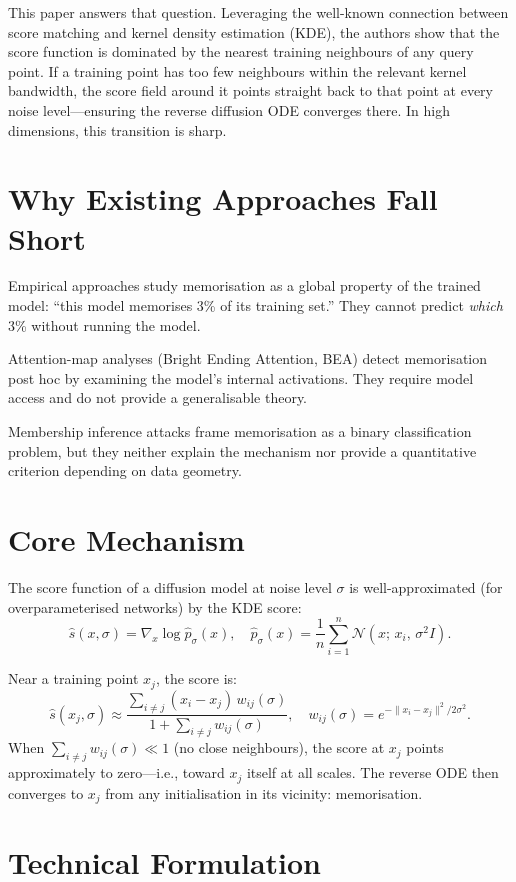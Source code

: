 \documentclass[10pt,twocolumn]{article}
\begin{document}
This paper answers that question. Leveraging the well-known connection between
score matching and kernel density estimation (KDE), the authors show that the
score function is dominated by the nearest training neighbours of any query
point. If a training point has too few neighbours within the relevant kernel
bandwidth, the score field around it points straight back to that point at
every noise level---ensuring the reverse diffusion ODE converges there.
In high dimensions, this transition is sharp.

\section{Why Existing Approaches Fall Short}

Empirical approaches study memorisation as a global property of the
trained model: ``this model memorises 3\% of its training set.'' They
cannot predict \emph{which} 3\% without running the model.

Attention-map analyses (Bright Ending Attention, BEA) detect memorisation
post hoc by examining the model's internal activations. They require
model access and do not provide a generalisable theory.

Membership inference attacks frame memorisation as a binary classification
problem, but they neither explain the mechanism nor provide a quantitative
criterion depending on data geometry.

\section{Core Mechanism}

The score function of a diffusion model at noise level $\sigma$ is
well-approximated (for overparameterised networks) by the KDE score:
\[
\hat s(x,\sigma) = \nabla_x \log \hat p_\sigma(x),
\quad
\hat p_\sigma(x) = \frac{1}{n}\sum_{i=1}^n \mathcal{N}(x;\,x_i,\,\sigma^2 I).
\]

Near a training point $x_j$, the score is:
\[
\hat s(x_j, \sigma)
\approx \frac{\sum_{i\neq j}(x_i - x_j)\,w_{ij}(\sigma)}
             {1 + \sum_{i\neq j} w_{ij}(\sigma)},
\quad
w_{ij}(\sigma) = e^{-\|x_i - x_j\|^2/2\sigma^2}.
\]
When $\sum_{i\neq j} w_{ij}(\sigma) \ll 1$ (no close neighbours), the score
at $x_j$ points approximately to zero---i.e., toward $x_j$ itself at all
scales. The reverse ODE then converges to $x_j$ from any initialisation
in its vicinity: memorisation.

\section{Technical Formulation}
\end{document}

